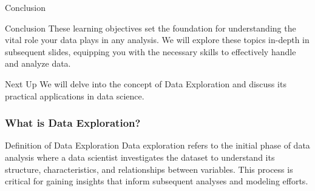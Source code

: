 \documentclass[aspectratio=169]{beamer}
\begin{document}
\begin{frame}[fragile]{Conclusion}
    \begin{block}{Conclusion}
        These learning objectives set the foundation for understanding the vital role your data plays in any analysis. 
        We will explore these topics in-depth in subsequent slides, equipping you with the necessary skills to effectively handle and analyze data.
    \end{block}
    
    \begin{block}{Next Up}
        We will delve into the concept of Data Exploration and discuss its practical applications in data science.
    \end{block}
\end{frame}

\begin{frame}[fragile]
  \frametitle{What is Data Exploration?}
  \begin{block}{Definition of Data Exploration}
    Data exploration refers to the initial phase of data analysis where a data scientist investigates the dataset to understand its structure, characteristics, and relationships between variables. This process is critical for gaining insights that inform subsequent analyses and modeling efforts.
  \end{block}
\end{frame}
\end{document}
